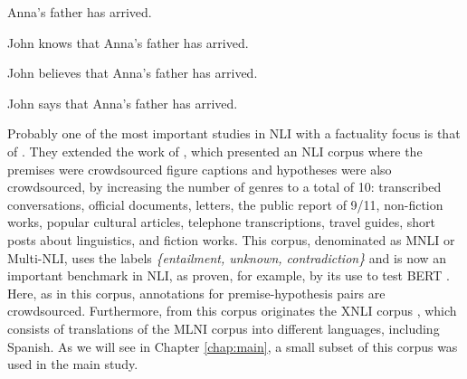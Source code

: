 \begin{exe}
  \ex
    \begin{xlist}
          \item Anna's father has arrived. \label{ex:verfac1a}
          \item John knows that Anna's father has arrived. \label{ex:verfac1b}
          \item John believes that Anna's father has arrived. \label{ex:verfac1c}
          \item John says that Anna's father has arrived. \label{ex:verfac1d}
        \end{xlist}
\end{exe}

Probably one of the most important studies in NLI with a factuality focus is that of \citet{williams2017broad}. They extended the work of \citet{bowman2015large}, which presented an NLI corpus where the premises were crowdsourced figure captions and hypotheses were also crowdsourced, by increasing the number of genres to a total of 10: transcribed conversations, official documents, letters, the public report of 9/11, non-fiction works, popular cultural articles, telephone transcriptions, travel guides, short posts about linguistics, and fiction works. This corpus, denominated as MNLI or Multi-NLI, uses the labels \textit{\{entailment, unknown, contradiction\}} and is now an important benchmark in NLI, as proven, for example, by its use to test BERT \citep{devlin2018bert}. Here, as in this corpus, annotations for premise-hypothesis pairs are crowdsourced. Furthermore, from this corpus originates the XNLI corpus \citep{conneau2018xnli}, which consists of translations of the MLNI corpus into different languages, including Spanish. As we will see in Chapter \ref{chap:main}, a small subset of this corpus was used in the main study.\\

